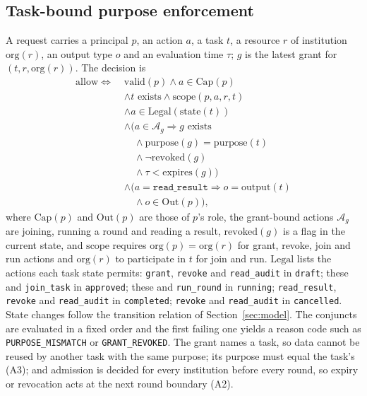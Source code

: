 \documentclass[pdflatex,iicol,sn-mathphys-num]{sn-jnl}
\theoremstyle{thmstyleone}
\begin{document}
\subsection{Task-bound purpose enforcement}\label{sec:policy}
A request carries a principal $p$, an action $a$, a task $t$, a resource $r$ of institution $\mathrm{org}(r)$, an output type $o$ and an evaluation time $\tau$; $g$ is the latest grant for $(t,r,\mathrm{org}(r))$. The decision is
\begin{equation}\label{eq:predicate}
\begin{aligned}
\mathrm{allow} \iff\;& \mathrm{valid}(p) \wedge a \in \mathrm{Cap}(p)\\
&\wedge t \text{ exists} \wedge \mathrm{scope}(p,a,r,t)\\
&\wedge a \in \mathrm{Legal}(\mathrm{state}(t)) \\
&\wedge \big(a \in \mathcal{A}_g \Rightarrow g \text{ exists}\\
&\quad\wedge \mathrm{purpose}(g)=\mathrm{purpose}(t)\\
&\quad\wedge \neg\mathrm{revoked}(g)\\
&\quad\wedge \tau < \mathrm{expires}(g)\big) \\
&\wedge \big(a = \texttt{read\_result} \Rightarrow o = \mathrm{output}(t)\\
&\quad\wedge o \in \mathrm{Out}(p)\big),
\end{aligned}
\end{equation}
where $\mathrm{Cap}(p)$ and $\mathrm{Out}(p)$ are those of $p$'s role, the grant-bound actions $\mathcal{A}_g$ are joining, running a round and reading a result, $\mathrm{revoked}(g)$ is a flag in the current state, and $\mathrm{scope}$ requires $\mathrm{org}(p)=\mathrm{org}(r)$ for grant, revoke, join and run actions and $\mathrm{org}(r)$ to participate in $t$ for join and run. $\mathrm{Legal}$ lists the actions each task state permits: \texttt{grant}, \texttt{revoke} and \texttt{read\_audit} in \texttt{draft}; these and \texttt{join\_task} in \texttt{approved}; these and \texttt{run\_round} in \texttt{running}; \texttt{read\_result}, \texttt{revoke} and \texttt{read\_audit} in \texttt{completed}; \texttt{revoke} and \texttt{read\_audit} in \texttt{cancelled}. State changes follow the transition relation of Section~\ref{sec:model}. The conjuncts are evaluated in a fixed order and the first failing one yields a reason code such as \texttt{PURPOSE\_MISMATCH} or \texttt{GRANT\_REVOKED}. The grant names a task, so data cannot be reused by another task with the same purpose; its purpose must equal the task's (A3); and admission is decided for every institution before every round, so expiry or revocation acts at the next round boundary (A2).
\end{document}
